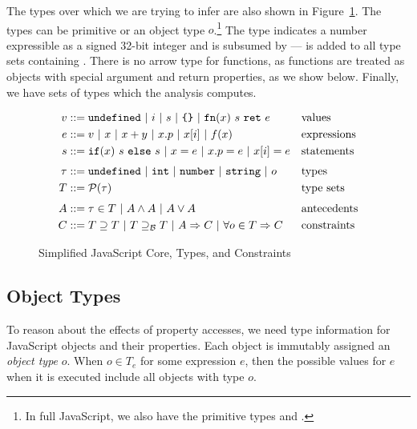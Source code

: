 The types over which we are trying to infer are also shown in
Figure~\ref{fig:js-core}. The types can be primitive or an object type
$o$.\footnote{In full JavaScript, we also have the primitive types 
  and .} The  type indicates a number expressible as a
signed 32-bit integer and is subsumed by  ---  is added
to all type sets containing . There is no arrow type for
functions, as functions are treated as objects with special argument and
return properties, as we show below. Finally, we have sets of types
which the analysis computes.

\newcommand{\barrier}{\supseteq_\mathcal{B}}

\begin{figure}
\begin{align*}
v & ::= \code{undefined}\ |\ i\ |\ s\ |\ \text{\code{\{\}}}\ |\ \code{fn}(x)\ s\ \code{ret}\ e&& \text{values}\\
e & ::= v\ |\ x\ |\ x + y\ |\ x.p\ |\ x[i]\ |\ f(x) && \text{expressions}\\
s & ::= \code{if}(x)\ s\ \code{else}\ s\ |\ x = e\ |\ x.p = e\ |\ x[i] = e && \text{statements}\\[0.7ex]
\tau & ::= \code{undefined}\ |\ \code{int}\ |\ \code{number}\ |\ \code{string}\ |\ o && \text{types}\\
T & ::= \mathcal{P}(\tau) && \text{type sets}\\[0.8ex]
A & ::= \tau \in T\ |\ A \wedge A\ |\ A \vee A && \text{antecedents}\\
C & ::= T \supseteq T\ |\ T \barrier T\ |\ A \Implies C\ |\ \forall o \in T \Implies C && \text{constraints}
\end{align*}
\caption{Simplified JavaScript Core, Types, and Constraints}
\label{fig:js-core}
\end{figure}



\subsection{Object Types}
\label{sec:object-types}

To reason about the effects of property accesses, we need type information
for JavaScript objects and their properties.
Each object is immutably assigned an {\it object type} $o$.
When $o \in T_e$ for some expression $e$, then the possible values
for $e$ when it is executed include all objects with type $o$.

